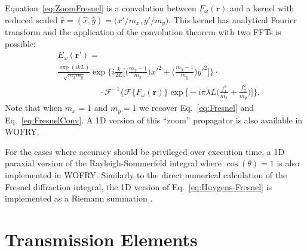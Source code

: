\documentclass{iucr}              %
\begin{document}
Equation~\ref{eq:ZoomFresnel} is a convolution between $F_\omega(\textbf{r})$ and a kernel with reduced scaled $\hat{\textbf{r}}=(\hat{x},\hat{y})=\big(x'\big/m_x, y'\big/m_y\big)$. This kernel has analytical Fourier transform and the application of the convolution theorem with two FFTs is possible:
\begin{equation}\label{eq:ZoomFresnelConv}
\begin{split}
&E_\omega(\textbf{r}') =\\
&\frac{\exp{(ikL)}}{\sqrt{m_xm_y}}\exp{\bigg\{i\frac{k}{2L}\bigg[\bigg(\frac{m_x-1}{m_x}\bigg)x'^2 +\bigg(\frac{m_y-1}{m_y}\bigg)y'^2\bigg]\bigg\}}\cdot\\
&\qquad\qquad\quad\cdot\mathcal{F}^{-1}\bigg\{\mathcal{F}\{F_\omega(\textbf{r})\}\exp\bigg[-i\pi\lambda L\bigg(\frac{f_x^2}{m_x} +\frac{f_y^2}{m_y}\bigg)\bigg]\bigg\}.
\end{split}
\end{equation}
Note that when $m_x=1$ and $m_y=1$ we recover Eq.~\ref{eq:Fresnel} and Eq.~\ref{eq:FresnelConv}. A 1D version of this ``zoom'' propagator is also available in WOFRY.

For the cases where accuracy should be privileged over execution time, a 1D paraxial version of the Rayleigh-Sommerfeld integral where $\cos(\theta)=1$ is also implemented in WOFRY. Similarly to the direct numerical calculation of the Fresnel diffraction integral, the 1D version of Eq.~\ref{eq:Huygens-Fresnel} is implemented as a Riemann summation \cite{srioLBL}. 


\section{Transmission Elements}
\label{sec:appendixTransmissionElements}
\end{document}
